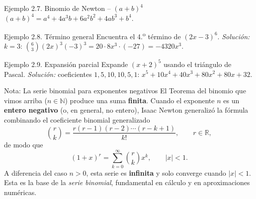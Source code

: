 \documentclass[12pt,letterpaper]{book}
\begin{document}
\begin{center}
\end{center}

\begin{ejbox}{Ejemplo 2.7. Binomio de Newton -- $(a+b)^4$}
$(a+b)^4=a^4+4a^3b+6a^2b^2+4ab^3+b^4$.
\end{ejbox}

\begin{ejbox}{Ejemplo 2.8. Término general}
Encuentra el 4.\textsuperscript{o} término de $(2x-3)^6$. \textit{Solución:} $k=3$: $\binom{6}{3}(2x)^3(-3)^3=20\cdot8x^3\cdot(-27)=-4320x^3$.
\end{ejbox}

\begin{ejbox}{Ejemplo 2.9. Expansión parcial}
Expande $(x+2)^5$ usando el triángulo de Pascal. \textit{Solución:} coeficientes $1,5,10,10,5,1$: $x^5+10x^4+40x^3+80x^2+80x+32$.
\end{ejbox}

\begin{histbox}{Nota: La serie binomial para exponentes negativos}
El Teorema del binomio que vimos arriba ($n\in\mathbb{N}$) produce una suma \textbf{finita}. Cuando el exponente $n$ es un \textbf{entero negativo} (o, en general, no entero), Isaac Newton generalizó la fórmula combinando el coeficiente binomial generalizado
\[ \binom{r}{k} = \frac{r(r-1)(r-2)\cdots(r-k+1)}{k!},\qquad r\in\mathbb{R}, \]
de modo que
\[ (1+x)^r = \sum_{k=0}^{\infty}\binom{r}{k}x^k,\qquad |x|<1. \]
A diferencia del caso $n>0$, esta serie es \textbf{infinita} y solo converge cuando $|x|<1$. Esta es la base de la \emph{serie binomial}, fundamental en cálculo y en aproximaciones numéricas.
\end{histbox}
\end{document}
